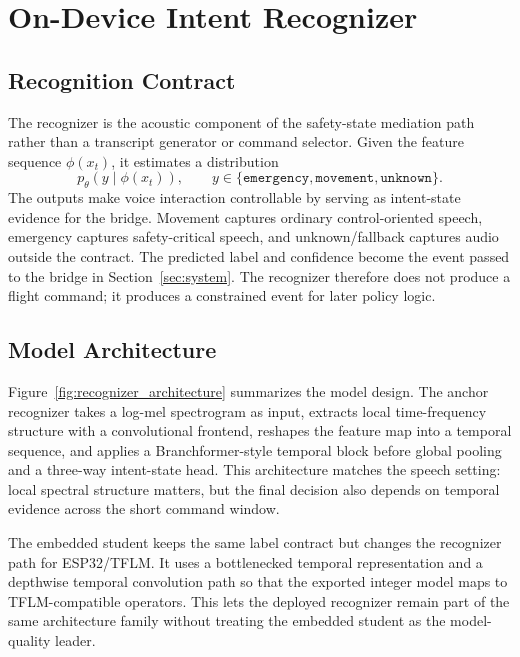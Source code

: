 \section{On-Device Intent Recognizer}
\label{sec:recognizer}



\subsection{Recognition Contract}

The recognizer is the acoustic component of the safety-state mediation path rather than a transcript generator or command selector. Given the feature sequence $\phi(x_t)$, it estimates a distribution
\[
p_{\theta}(y \mid \phi(x_t)), \qquad
y \in \{\texttt{emergency}, \texttt{movement}, \texttt{unknown}\}.
\]
The outputs make voice interaction controllable by serving as intent-state evidence for the bridge. Movement captures ordinary control-oriented speech, emergency captures safety-critical speech, and unknown/fallback captures audio outside the contract. The predicted label and confidence become the event passed to the bridge in Section~\ref{sec:system}. The recognizer therefore does not produce a flight command; it produces a constrained event for later policy logic.

\subsection{Model Architecture}

Figure~\ref{fig:recognizer_architecture} summarizes the model design. The anchor recognizer takes a log-mel spectrogram as input, extracts local time-frequency structure with a convolutional frontend, reshapes the feature map into a temporal sequence, and applies a Branchformer-style temporal block before global pooling and a three-way intent-state head. This architecture matches the speech setting: local spectral structure matters, but the final decision also depends on temporal evidence across the short command window.

The embedded student keeps the same label contract but changes the recognizer path for ESP32/TFLM. It uses a bottlenecked temporal representation and a depthwise temporal convolution path so that the exported integer model maps to TFLM-compatible operators. This lets the deployed recognizer remain part of the same architecture family without treating the embedded student as the model-quality leader.

